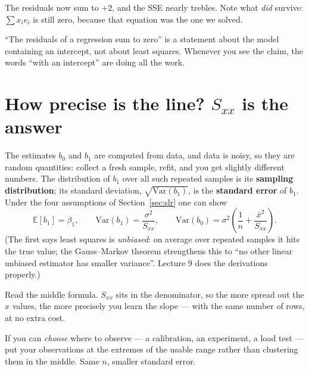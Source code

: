 \documentclass[11pt]{article}
\begin{document}
The residuals now sum to $+2$, and the SSE nearly trebles. Note what
\emph{did} survive: $\sum x_ie_i$ is still zero, because that equation was the
one we solved.

\begin{keyidea}
``The residuals of a regression sum to zero'' is a statement about the model
containing an intercept, not about least squares. Whenever you see the claim,
the words ``with an intercept'' are doing all the work.
\end{keyidea}

\section{How precise is the line? $S_{xx}$ is the answer}
\label{sec:precision}

The estimates $b_0$ and $b_1$ are computed from data, and data is noisy, so
they are random quantities: collect a fresh sample, refit, and you get
slightly different numbers. The distribution of $b_1$ over all such repeated
samples is its \textbf{sampling distribution}; its standard deviation,
$\sqrt{\mathrm{Var}(b_1)}$, is the \textbf{standard error} of $b_1$. Under the four assumptions of
Section~\ref{sec:slr} one can show
\begin{equation}
  \mathbb{E}[b_1] = \beta_1, \qquad
  \mathrm{Var}(b_1) = \frac{\sigma^2}{S_{xx}}, \qquad
  \mathrm{Var}(b_0) = \sigma^2\left(\frac1n + \frac{\bar x^2}{S_{xx}}\right).
  \label{eq:varb}
\end{equation}
(The first says least squares is \emph{unbiased}: on average over
repeated samples it hits the true value; the Gauss--Markov theorem
strengthens this to ``no other linear unbiased estimator has smaller
variance''. Lecture 9 does the derivations properly.)

Read the middle formula. $S_{xx}$ sits in the denominator, so the more spread
out the $x$ values, the more precisely you learn the slope --- with the same
number of rows, at no extra cost.

\begin{keyidea}
If you can \emph{choose} where to observe --- a calibration, an experiment, a
load test --- put your observations at the extremes of the usable range rather
than clustering them in the middle. Same $n$, smaller standard error.
\end{keyidea}
\end{document}
